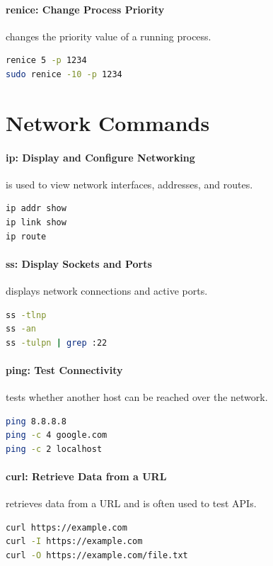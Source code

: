 \paragraph*{renice: Change Process Priority}
 changes the priority value of a running process.
\begin{lstlisting}[language=bash]
renice 5 -p 1234
sudo renice -10 -p 1234
\end{lstlisting}

\section{Network Commands}

\paragraph*{ip: Display and Configure Networking}
 is used to view network interfaces, addresses, and routes.
\begin{lstlisting}[language=bash]
ip addr show
ip link show
ip route
\end{lstlisting}

\paragraph*{ss: Display Sockets and Ports}
 displays network connections and active ports.
\begin{lstlisting}[language=bash]
ss -tlnp
ss -an
ss -tulpn | grep :22
\end{lstlisting}

\paragraph*{ping: Test Connectivity}
 tests whether another host can be reached over the network.
\begin{lstlisting}[language=bash]
ping 8.8.8.8
ping -c 4 google.com
ping -c 2 localhost
\end{lstlisting}

\paragraph*{curl: Retrieve Data from a URL}
 retrieves data from a URL and is often used to test APIs.
\begin{lstlisting}[language=bash]
curl https://example.com
curl -I https://example.com
curl -O https://example.com/file.txt
\end{lstlisting}

